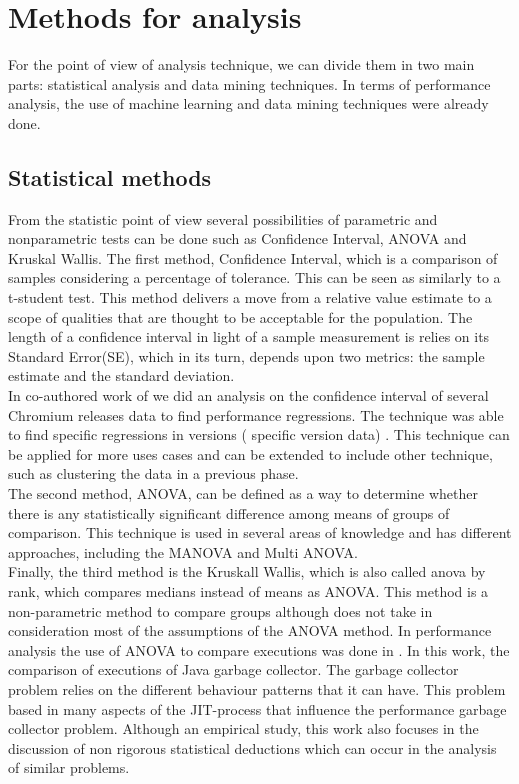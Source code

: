 \section{Methods for analysis}
For the point of view of analysis technique, we can divide them in two main parts: statistical analysis and data mining techniques. In terms of performance analysis, the use of machine learning and data mining techniques were already done.\\
\subsection{Statistical methods}
From the statistic point of view several possibilities of parametric and nonparametric tests can be done such as Confidence Interval, ANOVA and Kruskal Wallis.
The first method, Confidence Interval, which is a comparison of samples considering a percentage of tolerance. This can be seen as similarly to a t-student test.  This method delivers a move from a  relative value estimate to a scope of qualities that are thought to be acceptable for the population. The length of a confidence interval in light of a sample measurement is relies on its Standard Error(SE), which in its turn, depends upon two metrics: the sample estimate and the standard deviation.\\
In co-authored work of \cite{google_releases} we did an analysis on the confidence interval of several Chromium releases data to find performance regressions. The technique was able to find specific regressions in versions ( specific version data) . This technique can be applied for more uses cases and can be extended to include other technique, such as clustering the data in a previous phase.\\
The second method, ANOVA, can be defined as a way to determine whether there is any statistically significant difference among means of groups of comparison. This technique is used in several areas of knowledge and has different approaches, including the MANOVA and Multi ANOVA.\\
Finally, the third method is the Kruskall Wallis, which is also called anova by rank, which compares medians instead of means as ANOVA. This method is a non-parametric method to compare groups although does not take in consideration most of the assumptions of the ANOVA method.
In performance analysis the use of ANOVA to compare executions was done in \cite{rigorous_statistical}. In this work, the comparison of executions of Java garbage collector. The garbage collector problem relies on the different behaviour patterns that it can have. This problem based in many aspects of the JIT-process that influence the performance garbage collector problem. Although an empirical study, this work also focuses in the discussion of non rigorous statistical deductions which can occur in the analysis of similar problems. \\
